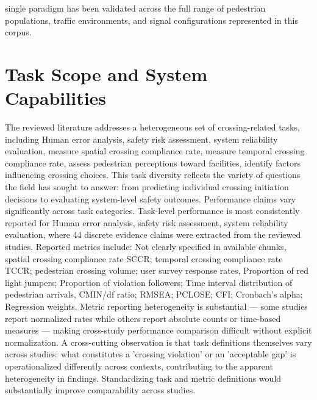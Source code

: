 \documentclass{article}
\begin{document}
single paradigm has been validated across the full range of pedestrian populations, traffic environments, and signal configurations represented in this corpus.

\section{Task Scope and System Capabilities}
The reviewed literature addresses a heterogeneous set of crossing-related tasks, including Human error analysis, safety risk assessment, system reliability evaluation, measure spatial crossing compliance rate, measure temporal crossing compliance rate, assess pedestrian perceptions toward facilities, identify factors influencing crossing choices. This task diversity reflects the variety of questions the field has sought to answer: from predicting individual crossing initiation decisions to evaluating system-level safety outcomes. Performance claims vary significantly across task categories. Task-level performance is most consistently reported for Human error analysis, safety risk assessment, system reliability evaluation, where 44 discrete evidence claims were extracted from the reviewed studies. Reported metrics include: Not clearly specified in available chunks, spatial crossing compliance rate SCCR; temporal crossing compliance rate TCCR; pedestrian crossing volume; user survey response rates, Proportion of red light jumpers; Proportion of violation followers; Time interval distribution of pedestrian arrivals, CMIN/df ratio; RMSEA; PCLOSE; CFI; Cronbach's alpha; Regression weights. Metric reporting heterogeneity is substantial — some studies report normalized rates while others report absolute counts or time-based measures — making cross-study performance comparison difficult without explicit normalization. A cross-cutting observation is that task definitions themselves vary across studies: what constitutes a 'crossing violation' or an 'acceptable gap' is operationalized differently across contexts, contributing to the apparent heterogeneity in findings. Standardizing task and metric definitions would substantially improve comparability across studies.
\end{document}
